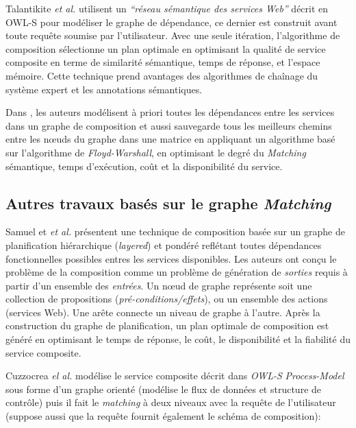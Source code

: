   Talantikite \textit{et al.} \cite{talantikite2009semantic} utilisent
  un \emph{``réseau sémantique des services Web''} décrit en
  \textsc{OWL-S} pour modéliser le graphe de dépendance, ce dernier
  est construit avant toute requête soumise par l'utilisateur. Avec
  une seule itération, l'algorithme de composition sélectionne un plan
  optimale en optimisant la qualité de service composite en terme de
  similarité sémantique, temps de réponse, et l'espace mémoire.
  Cette technique prend avantages des algorithmes de chaînage du
  système expert et les annotations sémantiques.\bigskip

  Dans \cite{elmaghraoui2011graph}, les auteurs modélisent à priori
  toutes les dépendances entre les services dans un graphe de
  composition et aussi sauvegarde tous les meilleurs chemins entre les
  nœuds du graphe dans une matrice en appliquant un algorithme basé
  sur l'algorithme de \textit{Floyd-Warshall}, en optimisant le degré
  du \textit{Matching} sémantique, temps d'exécution, coût et la
  disponibilité du service.

  \subsection{Autres travaux basés sur le graphe \textit{Matching}}
  \label{sec:autres-travaux}
  Samuel et \textit{et al.} \cite{samuel2011approach} présentent une
  technique de composition basée sur un graphe de planification
  hiérarchique (\textit{layered}) et pondéré reflétant toutes
  dépendances fonctionnelles possibles entres les services
  disponibles. Les auteurs ont conçu le problème de la composition
  comme un problème de génération de \textit{sorties} requis à partir
  d'un ensemble des \textit{entrées}. Un nœud de graphe représente
  soit une collection de propositions
  (\textit{pré-conditions/effets}), ou un ensemble des actions
  (services Web). Une arête connecte un niveau de graphe à l'autre.
  Après la construction du graphe de planification, un plan optimale
  de composition est généré en optimisant le temps de réponse, le
  coût, le disponibilité et la fiabilité du service composite.\bigskip

  Cuzzocrea \emph{el al.} \cite{cuzzocrea2011flexible} modélise le
  service composite décrit dans \textit{OWL-S} \textit{Process-Model}
  sous forme d'un graphe orienté (modélise le flux de données et
  structure de contrôle) puis il fait le \textit{matching} à deux
  niveaux avec la requête de l'utilisateur (suppose aussi que la
  requête fournit également le schéma de composition):

